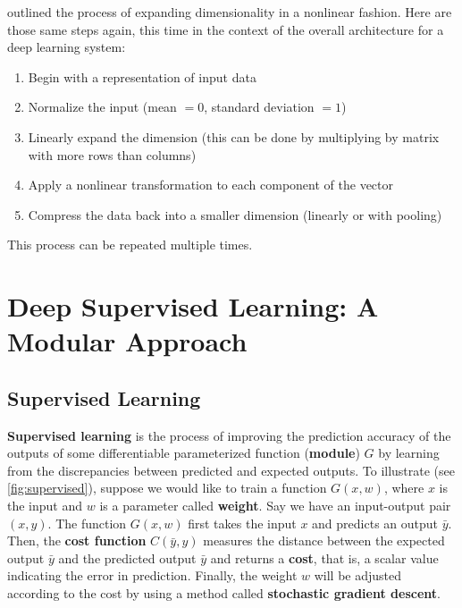  outlined the process of expanding dimensionality in a nonlinear fashion.
Here are those same steps again, this time in the context of the overall architecture for a deep learning system:
\begin{enumerate}
    \item Begin with a representation of input data
    \item Normalize the input (mean $= 0$, standard deviation $= 1$)
    \item Linearly expand the dimension (this can be done by multiplying by matrix with more rows than columns)
    \item Apply a nonlinear transformation to each component of the vector
    \item Compress the data back into a smaller dimension (linearly or with pooling) 
\end{enumerate}
This process can be repeated multiple times.

\chapter{Deep Supervised Learning: A Modular Approach}

\section{Supervised Learning}\label{sec: supervised learning}

\textbf{Supervised learning} is the process of improving the prediction accuracy of the outputs of some differentiable parameterized function (\textbf{module}) $G$ by learning from the discrepancies between predicted and expected outputs.
To illustrate (see \cref{fig:supervised}), suppose we would like to train a function $G(x,w)$, where $x$ is the input and $w$ is a parameter called \textbf{weight}.
Say we have an input-output pair $(x,y)$.
The function $G(x,w)$ first takes the input $x$ and predicts an output $\bar{y}$.
Then, the \textbf{cost function} $C(\bar{y},y)$ measures the distance between the expected output $\bar{y}$ and the predicted output $\bar{y}$ and returns a \textbf{cost}, that is, a scalar value indicating the error in prediction.
Finally, the weight $w$ will be adjusted according to the cost by using a method called \textbf{stochastic gradient descent}. 

